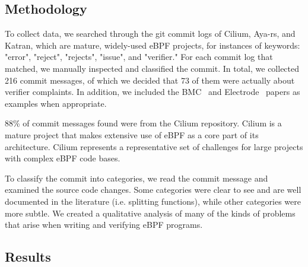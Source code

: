 
\subsection{Methodology}
To collect data, we searched through the git commit logs of Cilium, Aya-rs, and
    Katran, which are mature, widely-used eBPF projects, for instances of
    keywords: "error", "reject", "rejects", "issue", and "verifier."
For each commit log that matched, we manually inspected and classified the commit.%
In total, we collected 216 commit messages, of which we decided that 73 of them were actually about verifier complaints.
In addition, we included the BMC~\cite{BMC} and Electrode~\cite{Electrode} papers as examples when appropriate.

88\% of commit messages found were from the Cilium repository.
Cilium is a mature project that makes extensive use of eBPF as a core part of its architecture.
Cilium represents a representative set of challenges for large projects with complex eBPF code bases.

To classify the commit into categories, we read the commit message and examined
    the source code changes.
Some categories were clear to see and are well documented in the literature (i.e. splitting functions), while other categories were more subtle.
We created a qualitative analysis of many of the kinds of problems that arise when writing and verifying eBPF programs.

\subsection{Results}

